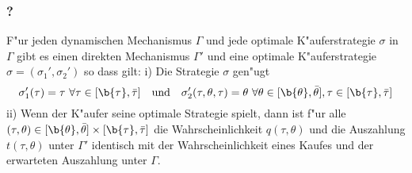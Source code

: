 \begin{frame}
  \frametitle{?}
  \begin{thmP}
    F"ur jeden dynamischen Mechanismus $\Gamma$ und jede optimale K"auferstrategie $\sigma$ in $\Gamma$ gibt es
    einen direkten Mechanismus $\Gamma'$ und eine optimale K"auferstrategie $\sigma =(\sigma_{1}', \sigma_{2}')$
    so dass gilt: \newline \newline
    i) Die Strategie $\sigma$ gen"ugt
    \begin{equation*}
      \sigma_{1}' (\tau) = \tau \ \forall  \tau \in [\b{\tau} , \bar{\tau} ]
      \quad \text{und} \quad
      \sigma_{2}' (\tau, \theta, \tau) = \theta \ \forall  \theta \in [\b{\theta} , \bar{\theta} ], \tau \in [\b{\tau} , \bar{\tau} ]
    \end{equation*}
    ii) Wenn der K"aufer seine optimale Strategie spielt, dann ist f"ur alle
    $(\tau, \theta) \in [\b{\theta} , \bar{\theta} ] \times [\b{\tau} , \bar{\tau} ]$ die
    Wahrscheinlichkeit $q( \tau, \theta)$ und die Auszahlung $t(\tau, \theta)$ unter $\Gamma'$ identisch mit der
    Wahrscheinlichkeit eines Kaufes und der erwarteten Auszahlung unter $\Gamma$.
  \end{thmP}
\end{frame}
